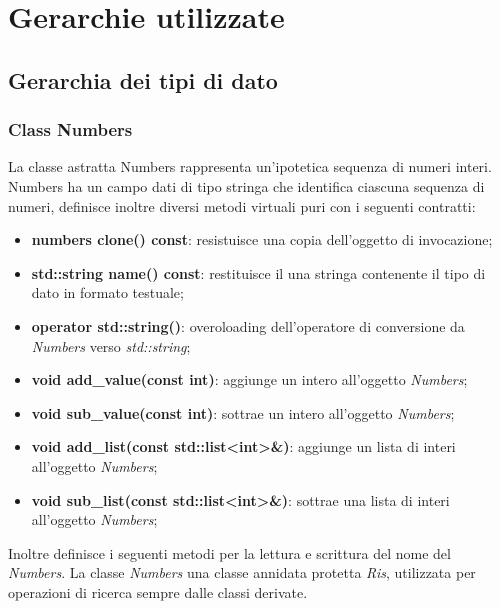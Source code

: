 \documentclass[a4paper,10pt]{article}
\begin{document}
	\section{Gerarchie utilizzate}
	\subsection{Gerarchia dei tipi di dato}
	\subsubsection{Class Numbers}
	La classe astratta Numbers rappresenta un’ipotetica sequenza di numeri interi. Numbers ha un campo dati di tipo stringa che identifica ciascuna sequenza di numeri, definisce inoltre diversi metodi virtuali puri con i seguenti contratti:
	\begin{itemize}
	 	\item \textbf{numbers\* clone() const}: resistuisce una copia dell'oggetto di invocazione;
		\item \textbf{std::string name() const}: restituisce il una stringa contenente il tipo di dato in formato testuale;
		\item \textbf{operator std::string()}: overoloading dell'operatore di conversione da \textit{Numbers} verso \textit{std::string};
		\item \textbf{void add\_value(const int)}: aggiunge un intero all'oggetto \textit{Numbers};
		\item \textbf{void sub\_value(const int)}: sottrae un intero all'oggetto \textit{Numbers};
		\item \textbf{void add\_list(const std::list<int>\&)}: aggiunge un lista di interi all'oggetto \textit{Numbers};
		\item \textbf{void sub\_list(const std::list<int>\&)}: sottrae una lista di interi all'oggetto \textit{Numbers};
	\end{itemize}
    Inoltre definisce i seguenti metodi per la lettura e scrittura del nome del \textit{Numbers}.
    La classe \textit{Numbers} una classe annidata protetta \textit{Ris}, utilizzata per operazioni di ricerca sempre dalle classi derivate.
    
\end{document}
